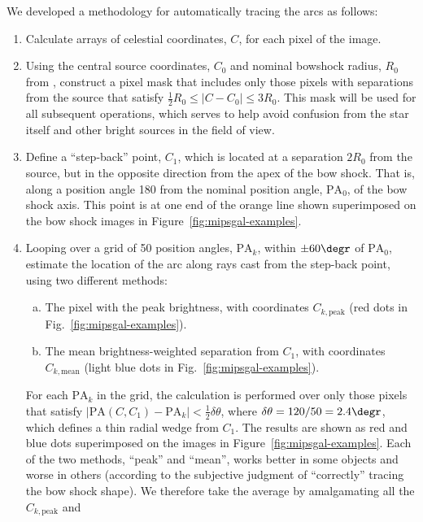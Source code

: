 We developed a methodology for automatically tracing the arcs as follows:
\begin{enumerate}[1.]
\item Calculate arrays of celestial coordinates, \(C\), for each pixel
  of the image.
\item Using the central source coordinates, \(C_0\) and nominal
  bowshock radius, \(R_0\) from \citet{Kobulnicky:2016a}, construct a
  pixel mask that includes only those pixels with separations from the
  source that satisfy \(\frac12 R_0 \le |C - C_0| \le 3 R_0\).  This mask
  will be used for all subsequent operations, which serves to help
  avoid confusion from the star itself and other bright sources in the
  field of view.
\item Define a ``step-back'' point, \(C_1\), which is located at a
  separation \(2 R_0\) from the source, but in the opposite direction
  from the apex of the bow shock. That is, along a position angle
  180\degr{} from the nominal position angle, \(\text{PA}_0\), of the
  bow shock axis.  This point is at one end of the orange line shown
  superimposed on the bow shock images in
  Figure~\ref{fig:mipsgal-examples}.
\item Looping over a grid of 50 position angles, \(\text{PA}_k\),
  within \(\pm 60\degr\) of \(\text{PA}_0\), estimate the location of
  the arc along rays cast from the step-back point, using two
  different methods:
  \begin{enumerate}[(a)]
  \item The pixel with the peak brightness, with coordinates
    \(C_{k,\text{peak}}\) (red dots in
    Fig.~\ref{fig:mipsgal-examples}).
  \item The mean brightness-weighted separation from \(C_1\), with
    coordinates \(C_{k,\text{mean}}\) (light blue dots in
    Fig.~\ref{fig:mipsgal-examples}).
  \end{enumerate}
  For each \(\text{PA}_k\) in the grid, the calculation is performed
  over only those pixels that satisfy
  \(|\text{PA}(C, C_1) - \text{PA}_k| < \frac12 \delta\theta\), where
  \(\delta\theta = 120/50 = 2.4\degr\), which defines a thin radial wedge from
  \(C_1\).  The results are shown as red and blue dots superimposed
  on the images in Figure~\ref{fig:mipsgal-examples}. Each of the two
  methods, ``peak'' and ``mean'', works better in some objects and
  worse in others (according to the subjective judgment of
  ``correctly'' tracing the bow shock shape).  We therefore take the
  average by amalgamating all the \(C_{k,\text{peak}}\) and

\end{enumerate}

